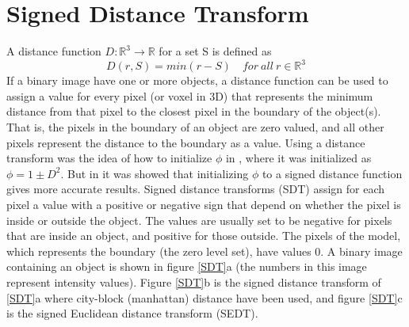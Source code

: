 \section{Signed Distance Transform}
A distance function \(D: \mathbb{R}^3 \rightarrow \mathbb{R}\) for a set S is defined as 
\begin{equation}
D(r,S) = min(r-S) \quad for \ all \ r \in{\mathbb{R}^3}
\end{equation}
If a binary image have one or more objects, a distance function can be used to assign a value for every pixel (or voxel in 3D) that represents the minimum distance from that pixel to the closest pixel in the boundary of the object(s). That is, the pixels in the boundary of an object are zero valued, and all other pixels represent the distance to the boundary as a value. Using a distance transform was the idea of how to initialize \(\phi\) in \cite{osher88}, where it was initialized as \(\phi = 1 \pm D^2\). But in \cite{mulder92} it was showed that initializing \(\phi\) to a signed distance function gives more accurate results. Signed distance transforms (SDT) assign for each pixel a value with a positive or negative sign that depend on whether the pixel is inside or outside the object. The values are usually set to be negative for pixels that are inside an object, and positive for those outside. The pixels of the model, which represents the boundary (the zero level set), have values 0. A binary image containing an object is shown in figure \ref{SDT}a (the numbers in this image represent intensity values). Figure \ref{SDT}b is the signed distance transform of \ref{SDT}a where city-block (manhattan) distance have been used, and figure \ref{SDT}c is the signed Euclidean distance transform (SEDT).

